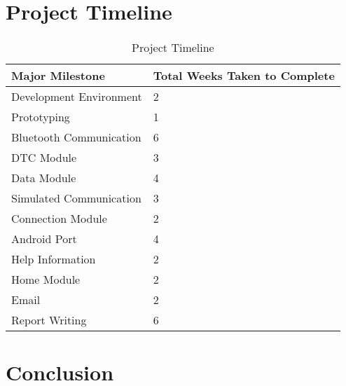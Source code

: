 {\section{Project Timeline}
	\paragraph{}{
	}
	\begin{table}[ht]		
			\begin{center}				
				\begin{tabularx}{\textwidth}{| X | l |}								
				\hline
				\textbf{Major Milestone} & \textbf{Total Weeks Taken to Complete}\\
				\hline				
				Development Environment & 2\\
				\hline
				Prototyping & 1\\
				\hline
				Bluetooth Communication & 6\\
				\hline
				DTC Module & 3\\
				\hline
				Data Module & 4\\
				\hline				
				Simulated Communication & 3\\
				\hline
				Connection Module & 2\\
				\hline
				Android Port & 4\\
				\hline
				Help Information & 2\\
				\hline
				Home Module & 2\\
				\hline
				Email & 2\\
				\hline
				Report Writing & 6 \\
				\hline
				\end{tabularx}
				\caption{Project Timeline}
				\label{tab:ProjectTimeLine}
			\end{center}
	\end{table}
	
\section{Conclusion}
}

